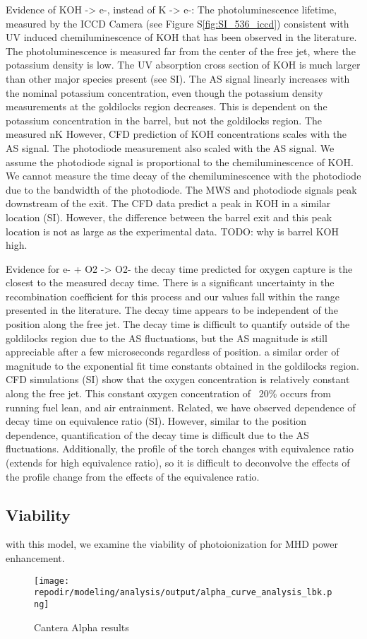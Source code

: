 \begin{outline}
\1 Evidence of KOH -> e-, instead of K -> e-:
    \2 The photoluminescence lifetime, measured by the ICCD Camera (see Figure S\ref*{fig:SI_536_iccd}) consistent with UV induced chemiluminescence of KOH that has been observed in the literature. The photoluminescence is measured far from the center of the free jet, where the potassium density is low.
    \2 The UV absorption cross section of KOH is much larger than other major species present (see SI).
    \2 The AS signal linearly increases with the nominal potassium concentration, even though the potassium density measurements at the goldilocks region decreases. This   is dependent on the potassium concentration in the barrel, but not the goldilocks region. The measured nK However, CFD prediction of KOH concentrations scales with the AS signal. The photodiode measurement also scaled with the AS signal. We assume the photodiode signal is proportional to the chemiluminescence of KOH. We cannot measure the time decay of the chemiluminescence with the photodiode due to the bandwidth of the photodiode.
    \2 The MWS and photodiode signals peak downstream of the exit. The CFD data predict a peak in KOH in a similar location (SI). However, the difference between the barrel exit and this peak location is not as large as the experimental data. TODO: why is barrel KOH high. 

\1 Evidence for e- + O2 -> O2-
    \2 the decay time predicted for oxygen capture is the closest to the measured decay time. There is a significant uncertainty in the recombination coefficient for this process and our values fall within the range presented in the literature. 
    \2 The decay time appears to be independent of the position along the free jet. The decay time is difficult to quantify outside of the goldilocks region due to the AS fluctuations, but the AS magnitude is still appreciable after a few microseconds regardless of position. a similar order of magnitude to the exponential fit time constants obtained in the goldilocks region. CFD simulations (SI) show that the oxygen concentration is relatively constant along the free jet. This constant oxygen concentration of ~20\% occurs from running fuel lean, and air entrainment. 
    \2 Related, we have observed dependence of decay time on equivalence ratio (SI). However, similar to the position dependence, quantification of the decay time is difficult due to the AS fluctuations. Additionally, the profile of the torch changes with equivalence ratio (extends for high equivalence ratio), so it is difficult to deconvolve the effects of the profile change from the effects of the equivalence ratio.

\end{outline}



\subsection{Viability}

with this model, we examine the viability of photoionization for MHD power enhancement. 

\begin{figure}[h]
    \texttt{[image: \\repodir/modeling/analysis/output/alpha\_curve\_analysis\_lbk.png]}
    \caption{Cantera Alpha results}
\end{figure}
